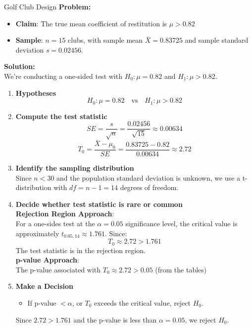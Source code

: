\documentclass[10pt, total={6in, 8in}]{extarticle}
\begin{document}
\begin{examplebox}{Golf Club Design}{}
    \textbf{Problem:}
    \begin{itemize}
        \item \textbf{Claim}: The true mean coefficient of restitution is $\mu > 0.82$
        \item \textbf{Sample}: $n = 15$ clubs, with sample mean $\bar{X} = 0.83725$ and sample standard deviation $s = 0.02456$.
    \end{itemize}
    \textbf{Solution:}\\
    We're conducting a one-sided test with $H_0: \mu = 0.82$ and $H_1: \mu > 0.82$.
    \begin{enumerate}
        \item \textbf{Hypotheses}
              $$H_0: \mu = 0.82 \quad \text{vs} \quad H_1: \mu > 0.82$$
        \item \textbf{Compute the test statistic}
              $$SE = \frac{s}{\sqrt{n}} = \frac{0.02456}{\sqrt{15}} \approx 0.00634$$
              $$T_0 = \frac{\bar{X} - \mu_0}{SE} = \frac{0.83725 - 0.82}{0.00634} \approx 2.72$$
        \item \textbf{Identify the sampling distribution}\\[1.5ex]
              Since $n < 30$ and the population standard deviation is unknown, we use a t-distribution with $df = n - 1 = 14$ degrees of freedom.\\[-1.5ex]
        \item \textbf{Decide whether test statistic is rare or common}\\[1.5ex]
              \textbf{Rejection Region Approach}: \\
              For a one-sides test at the $\alpha = 0.05$ significance level, the critical value is approximately $t_{0.05, 14} \approx 1.761$. Since:
              $$T_0 \approx 2.72 > 1.761$$
              The test statistic is in the rejection region. \\[1.5ex]
              \textbf{p-value Approach}:\\
              The p-value associated with $T_0 \approx 2.72 > 0.05$ (from the tables)
        \item \textbf{Make a Decision}
              \begin{itemize}
                  \item If  p-value $< \alpha$, or $T_0$ exceeds the critical value, reject $H_0$.
              \end{itemize}
              Since $2.72 > 1.761$ and the p-value is less than $\alpha = 0.05$, we reject $H_0$.

\end{enumerate}
\end{examplebox}
\end{document}
